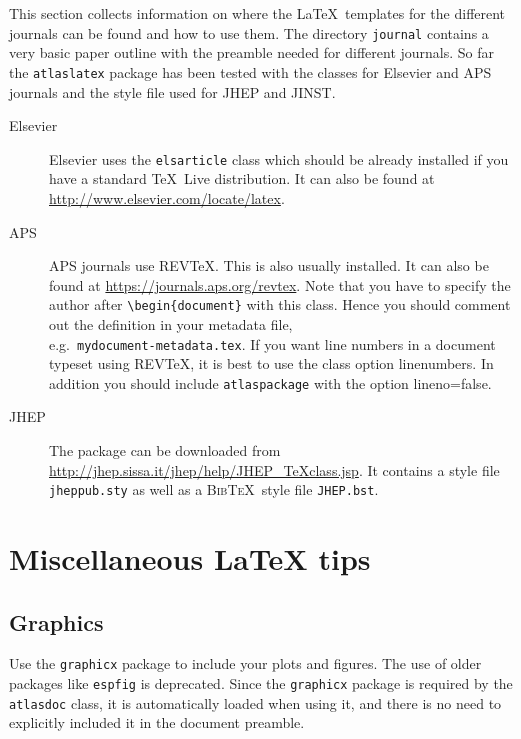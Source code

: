 \documentclass[atlasstyle,UKenglish]{latex/atlasdoc}
\newcommand{\BibTeX}{\textsc{Bib\TeX}}
\newcommand{\File}[1]{\texttt{#1}\xspace}
\newcommand{\Option}[1]{\textsf{#1}\xspace}
\newcommand{\Package}[1]{\texttt{#1}\xspace}
\begin{document}
This section collects information on where the \LaTeX\ templates for the different journals can be found and how to use them.
The directory \File{journal} contains a very basic paper outline with the preamble needed for different journals.
So far the \Package{atlaslatex} package has been tested with the classes for Elsevier and APS journals and the style file used for JHEP and JINST.

\begin{description}
\item[Elsevier]Elsevier uses the \texttt{elsarticle} class which should be already installed if you have a standard 
  \TeX\ Live distribution. 
  It can also be found at \url{http://www.elsevier.com/locate/latex}.
  
\item[APS]APS journals use REV\TeX. This is also usually installed.
  It can also be found at \url{https://journals.aps.org/revtex}.
  Note that you have to specify the author after \verb|\begin{document}| with this class.
  Hence you should comment out the definition in your metadata file,\\
  e.g.\ \File{mydocument-metadata.tex}.
  If you want line numbers in a document typeset using REV\TeX, it is best to use the class option \Option{linenumbers}.
  In addition you should include \Package{atlaspackage} with the option \Option{lineno=false}.
  
\item[JHEP]The package can be downloaded from \url{http://jhep.sissa.it/jhep/help/JHEP_TeXclass.jsp}. It contains a style file \File{jheppub.sty} as well as a \BibTeX\ style file \File{JHEP.bst}. 
\end{description}


\section{Miscellaneous \LaTeX{} tips}
\label{sec:latex}

\subsection{Graphics}

Use the \Package{graphicx} package to include your plots and figures. 
The use of older packages like \Package{espfig} is deprecated.
Since the \Package{graphicx} package is required by the \Package{atlasdoc}
class, it is automatically loaded when using it, and there is no need
to explicitly included it in the document preamble.
\end{document}
